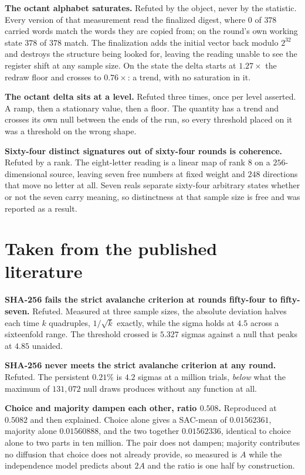 \textbf{The octant alphabet saturates.} Refuted by the object, never by the statistic. Every version of that measurement read the finalized digest, where \(0\) of \(378\) carried words match the words they are copied from; on the round's own working state \(378\) of \(378\) match. The finalization adds the initial vector back modulo \(2^{32}\) and destroys the structure being looked for, leaving the reading unable to see the register shift at any sample size. On the state the delta starts at \(1.27\times\) the redraw floor and crosses to \(0.76\times\): a trend, with no saturation in it.

\textbf{The octant delta sits at a level.} Refuted three times, once per level asserted. A ramp, then a stationary value, then a floor. The quantity has a trend and crosses its own null between the ends of the run, so every threshold placed on it was a threshold on the wrong shape.

\textbf{Sixty-four distinct signatures out of sixty-four rounds is coherence.} Refuted by a rank. The eight-letter reading is a linear map of rank \(8\) on a \(256\)-dimensional source, leaving seven free numbers at fixed weight and \(248\) directions that move no letter at all. Seven reals separate sixty-four arbitrary states whether or not the seven carry meaning, so distinctness at that sample size is free and was reported as a result.

\section{Taken from the published literature}

\textbf{SHA-256 fails the strict avalanche criterion at rounds fifty-four to fifty-seven.} Refuted. Measured at three sample sizes, the absolute deviation halves each time \(k\) quadruples, \(1/\sqrt{k}\) exactly, while the sigma holds at \(4.5\) across a sixteenfold range. The threshold crossed is \(5.327\) sigmas against a null that peaks at \(4.85\) unaided.

\textbf{SHA-256 never meets the strict avalanche criterion at any round.} Refuted. The persistent \(0.21\%\) is \(4.2\) sigmas at a million trials, \emph{below} what the maximum of \(131{,}072\) null draws produces without any function at all.

\textbf{Choice and majority dampen each other, ratio \(0.508\).} Reproduced at \(0.5082\) and then explained. Choice alone gives a SAC-mean of \(0.01562361\), majority alone \(0.01560888\), and the two together \(0.01562336\), identical to choice alone to two parts in ten million. The pair does not dampen; majority contributes no diffusion that choice does not already provide, so measured is \(A\) while the independence model predicts about \(2A\) and the ratio is one half by construction.

